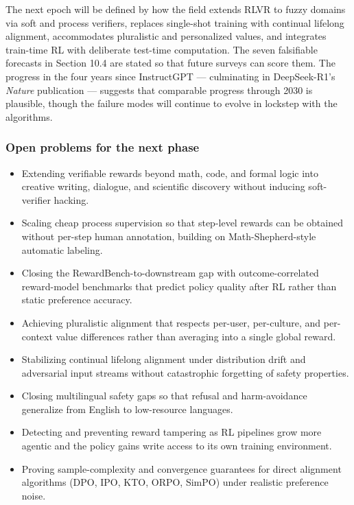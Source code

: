 The next epoch will be defined by how the field extends RLVR to fuzzy domains via soft and process verifiers, replaces single-shot training with continual lifelong alignment, accommodates pluralistic and personalized values, and integrates train-time RL with deliberate test-time computation. The seven falsifiable forecasts in Section 10.4 are stated so that future surveys can score them. The progress in the four years since InstructGPT --- culminating in DeepSeek-R1's \emph{Nature} publication --- suggests that comparable progress through 2030 is plausible, though the failure modes will continue to evolve in lockstep with the algorithms.

\subsubsection{Open problems for the next phase}\label{open-problems-for-the-next-phase}

\begin{itemize}
\tightlist
\item
  Extending verifiable rewards beyond math, code, and formal logic into creative writing, dialogue, and scientific discovery without inducing soft-verifier hacking.
\item
  Scaling cheap process supervision so that step-level rewards can be obtained without per-step human annotation, building on Math-Shepherd-style automatic labeling.
\item
  Closing the RewardBench-to-downstream gap with outcome-correlated reward-model benchmarks that predict policy quality after RL rather than static preference accuracy.
\item
  Achieving pluralistic alignment that respects per-user, per-culture, and per-context value differences rather than averaging into a single global reward.
\item
  Stabilizing continual lifelong alignment under distribution drift and adversarial input streams without catastrophic forgetting of safety properties.
\item
  Closing multilingual safety gaps so that refusal and harm-avoidance generalize from English to low-resource languages.
\item
  Detecting and preventing reward tampering as RL pipelines grow more agentic and the policy gains write access to its own training environment.
\item
  Proving sample-complexity and convergence guarantees for direct alignment algorithms (DPO, IPO, KTO, ORPO, SimPO) under realistic preference noise.
\end{itemize}

